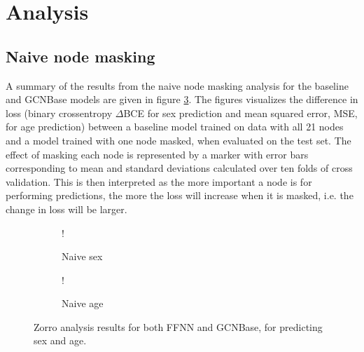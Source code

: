

\section{Analysis}
\subsection{Naive node masking}

A summary of the results from the naive node masking analysis for the baseline and GCNBase models are given in figure \ref{fig:naive_results}. The figures visualizes the difference in loss (binary crossentropy $\Delta$BCE for sex prediction and mean squared error, MSE, for age prediction) between a baseline model trained on data with all 21 nodes and a model trained with one node masked, when evaluated on the test set. The effect of masking each node is represented by a marker with error bars corresponding to mean and standard deviations calculated over ten folds of cross validation. This is then interpreted as the more important a node is for performing predictions, the more the loss will increase when it is masked, i.e. the change in loss will be larger.

\begin{figure}[H]
    \centering
        \begin{subfigure}{.5\textwidth}
            \centering
            \begin{center}
                 {!} {
                    
                }
            \end{center}
            \caption{Naive sex}
            \label{fig:naive_results_sex}
        \end{subfigure}%
        \begin{subfigure}{.5\textwidth}
            \centering
            \begin{center}
                 {!} {
                    
                }
            \end{center}
            \caption{Naive age}
            \label{fig:naive_results_age}
        \end{subfigure}
    \caption{Zorro analysis results for both FFNN and GCNBase, for predicting sex and age.}
    \label{fig:naive_results}
\end{figure}


